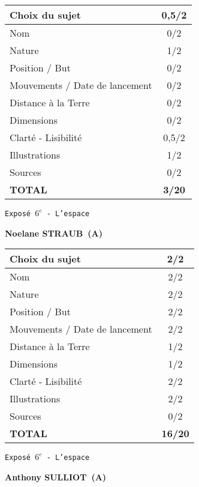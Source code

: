	\vspace*{2cm}
	\begin{tabular}{|l|c|}
		\hline
		Choix du sujet & 0,5/2 \\
		\hline
		Nom & 0/2 \\
		\hline
		Nature & 1/2 \\
		\hline
		Position / But & 0/2 \\
		\hline
		Mouvements / Date de lancement & 0/2 \\
		\hline
		Distance \`a la Terre & 0/2 \\
		\hline
		Dimensions & 0/2 \\
		\hline
		Clart\'e - Lisibilit\'e & 0,5/2 \\
		\hline
		Illustrations & 1/2 \\
		\hline
		Sources & 0/2 \\
		\hline
		\textbf{TOTAL}  & \textbf{3/20} \\
		\hline
	\end{tabular}
	\newline
	\LARGE{\texttt{Expos\'e $6^e$ - L'espace}}
	\vspace*{1cm}

	\textbf{Noelane STRAUB\ (A)}

	\vspace*{2cm}
	\begin{tabular}{|l|c|}
		\hline
		Choix du sujet & 2/2 \\
		\hline
		Nom & 2/2 \\
		\hline
		Nature & 2/2 \\
		\hline
		Position / But & 2/2 \\
		\hline
		Mouvements / Date de lancement & 2/2 \\
		\hline
		Distance \`a la Terre & 1/2 \\
		\hline
		Dimensions & 1/2 \\
		\hline
		Clart\'e - Lisibilit\'e & 2/2 \\
		\hline
		Illustrations & 2/2 \\
		\hline
		Sources & 0/2 \\
		\hline
		\textbf{TOTAL}  & \textbf{16/20} \\
		\hline
	\end{tabular}
	\newline
	\LARGE{\texttt{Expos\'e $6^e$ - L'espace}}
	\vspace*{1cm}

	\textbf{Anthony SULLIOT\ (A)}

